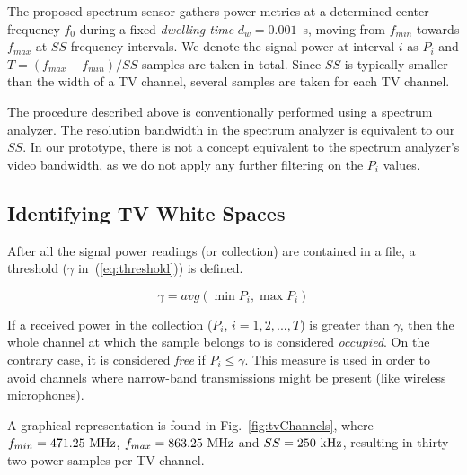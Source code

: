 The proposed spectrum sensor gathers power metrics at a determined center frequency $f_{0}$ during a fixed \emph{dwelling time} $d_{w}=0.001$~s, moving from $f_{min}$ towards $f_{max}$ at $SS$ frequency intervals. We denote the signal power at interval $i$ as $P_i$ and $T=(f_{max}-f_{min}) / SS$ samples are taken in total. Since $SS$ is typically smaller than the width of a TV channel, several samples are taken for each TV channel.

The procedure described above is conventionally performed using a spectrum analyzer. The resolution bandwidth in the spectrum analyzer is equivalent to our $SS$. In our prototype, there is not a concept equivalent to the spectrum analyzer's video bandwidth, as we do not apply any further filtering on the $P_{i}$ values.

\subsection{Identifying TV White Spaces}

After all the signal power readings (or collection) are contained in a file, a threshold ($\gamma$ in~(\ref{eq:threshold})) is defined.

\begin{equation} \label{eq:threshold}
 \gamma = avg(\min{P_{i}},\max{P_{i}})
\end{equation}

If a received power in the collection ($P_i$, $i=1,2,...,T$) is greater than $\gamma$, then the whole channel at which the sample belongs to is considered \emph{occupied}. On the contrary case, it is considered \emph{free} if $P_{i} \le \gamma$. This measure is used in order to avoid channels where narrow-band transmissions might be present (like wireless microphones).

A graphical representation is found in Fig.~\ref{fig:tvChannels}, where $f_{min}=471.25\  \rm{MHz}$, $f_{max}=863.25\  \rm{MHz}$ and $SS=250\  \rm{kHz}$, resulting in thirty two power samples per TV channel. 